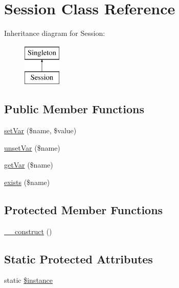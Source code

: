 \hypertarget{classSession}{
\section{Session Class Reference}
\label{classSession}
}
Inheritance diagram for Session:\begin{figure}[H]
\begin{center}
\leavevmode
\includegraphics[height=2.000000cm]{classSession}
\end{center}
\end{figure}
\subsection*{Public Member Functions}
\begin{DoxyCompactItemize}
\item 
\hyperlink{classSession_aed85e756b6654874dfd6c94f0382d061}{setVar} (\$name, \$value)
\item 
\hyperlink{classSession_ac0b791332d81ad7f542edeee935d0db4}{unsetVar} (\$name)
\item 
\hyperlink{classSession_a8cbfa64ffa31a33a61d62d4396985e07}{getVar} (\$name)
\item 
\hyperlink{classSession_a1747aaae205a1e90e14cb9de48120cd8}{exists} (\$name)
\end{DoxyCompactItemize}
\subsection*{Protected Member Functions}
\begin{DoxyCompactItemize}
\item 
\hyperlink{classSession_a36373ba15d6c8f932aeea02d7320d7c8}{\_\-\_\-construct} ()
\end{DoxyCompactItemize}
\subsection*{Static Protected Attributes}
\begin{DoxyCompactItemize}
\item 
static \hyperlink{classSession_a86a6e52b2a48eeafaaff766db1973cef}{\$instance}
\end{DoxyCompactItemize}


